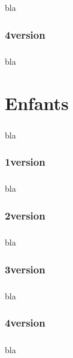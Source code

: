 \paragraph{}
bla

\subsection{4\ieme version}
\paragraph{}
bla

\chapter{Enfants}
\paragraph{}
bla

\subsection{1\ier version}
\paragraph{}
bla

\subsection{2\ieme version}
\paragraph{}
bla

\subsection{3\ieme version}
\paragraph{}
bla

\subsection{4\ieme version}
\paragraph{}
bla
